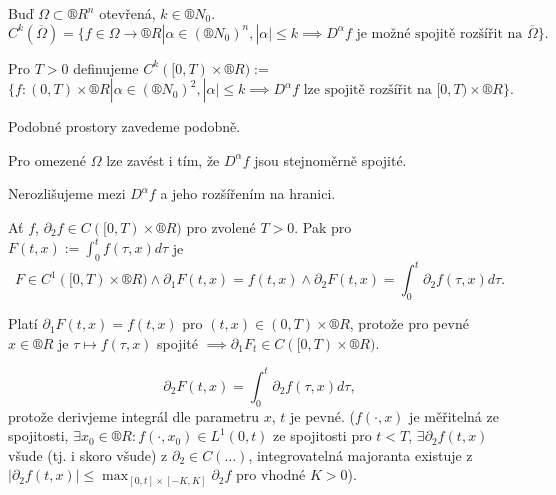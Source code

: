 \documentclass[12pt]{article}					%
\begin{document}
\begin{definice}
	Buď $\Omega \subset ®R^n$ otevřená, $k \in ®N_0$.
	$$ C^k(\overline{\Omega}) = \{f \in \Omega \rightarrow ®R | \alpha \in (®N_0)^n, |\alpha| ≤ k \implies D^\alpha f \text{ je možné spojitě rozšířit na } \overline{\Omega}\}. $$

	Pro $T > 0$ definujeme $C^k([0, T) \times ®R) :=$
	$$ \{f:(0, T) \times ®R | \alpha \in (®N_0)^2, |\alpha| ≤ k \implies D^\alpha f \text{ lze spojitě rozšířit na } [0, T)\times ®R\}. $$

	\begin{poznamkain}
		Podobné prostory zavedeme podobně.

		Pro omezené $\Omega$ lze zavést i tím, že $D^\alpha f$ jsou stejnoměrně spojité.

		Nerozlišujeme mezi $D^\alpha f$ a jeho rozšířením na hranici.
	\end{poznamkain}
\end{definice}

\begin{lemma}
	Ať $f$, $\partial_2 f \in C([0, T) \times ®R)$ pro zvolené $T > 0$. Pak pro $F(t, x) := \int_0^t f(\tau, x) d\tau$ je
	$$ F \in C^1([0, T) \times ®R) \land \partial_1 F(t, x) = f(t, x) \land \partial_2 F(t, x) = \int_0^t \partial_2 f(\tau, x) d\tau. $$

	\begin{dukazin}[Náznak]
		Platí $\partial_1 F(t, x) = f(t, x)$ pro $(t, x) \in (0, T) \times ®R$, protože pro pevné $x \in ®R$ je $\tau \mapsto f(\tau, x)$ spojité $\implies \partial_1 F_t \in C([0, T) \times ®R)$.

		$$ \partial_2 F(t, x) = \int_0^t \partial_2 f(\tau, x) d\tau, $$
		protože derivjeme integrál dle parametru $x$, $t$ je pevné. ($f(·, x)$ je měřitelná ze spojitosti, $\exists x_0 \in ®R: f(·, x_0) \in L^1(0, t)$ ze spojitosti pro $t < T$, $\exists \partial_2 f(t, x)$ všude (tj. i skoro všude) z $\partial_2 \in C(…)$, integrovatelná majoranta existuje z $|\partial_2 f(t, x)| ≤ \max_{[0, t] \times [-K, K]} \partial_2 f$ pro vhodné $K > 0$).
	\end{dukazin}
\end{lemma}
\end{document}
